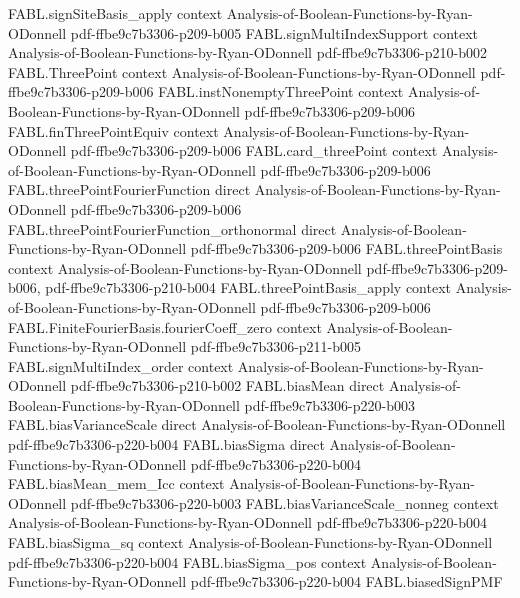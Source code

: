\begin{theorem}
\proofstep
  {FABL.signSiteBasis_apply}
  {context}
  {Analysis-of-Boolean-Functions-by-Ryan-ODonnell}
  {pdf-ffbe9c7b3306-p209-b005}
\proofstep
  {FABL.signMultiIndexSupport}
  {context}
  {Analysis-of-Boolean-Functions-by-Ryan-ODonnell}
  {pdf-ffbe9c7b3306-p210-b002}
\proofstep
  {FABL.ThreePoint}
  {context}
  {Analysis-of-Boolean-Functions-by-Ryan-ODonnell}
  {pdf-ffbe9c7b3306-p209-b006}
\proofstep
  {FABL.instNonemptyThreePoint}
  {context}
  {Analysis-of-Boolean-Functions-by-Ryan-ODonnell}
  {pdf-ffbe9c7b3306-p209-b006}
\proofstep
  {FABL.finThreePointEquiv}
  {context}
  {Analysis-of-Boolean-Functions-by-Ryan-ODonnell}
  {pdf-ffbe9c7b3306-p209-b006}
\proofstep
  {FABL.card_threePoint}
  {context}
  {Analysis-of-Boolean-Functions-by-Ryan-ODonnell}
  {pdf-ffbe9c7b3306-p209-b006}
\proofstep
  {FABL.threePointFourierFunction}
  {direct}
  {Analysis-of-Boolean-Functions-by-Ryan-ODonnell}
  {pdf-ffbe9c7b3306-p209-b006}
\proofstep
  {FABL.threePointFourierFunction_orthonormal}
  {direct}
  {Analysis-of-Boolean-Functions-by-Ryan-ODonnell}
  {pdf-ffbe9c7b3306-p209-b006}
\proofstep
  {FABL.threePointBasis}
  {context}
  {Analysis-of-Boolean-Functions-by-Ryan-ODonnell}
  {pdf-ffbe9c7b3306-p209-b006,
    pdf-ffbe9c7b3306-p210-b004}
\proofstep
  {FABL.threePointBasis_apply}
  {context}
  {Analysis-of-Boolean-Functions-by-Ryan-ODonnell}
  {pdf-ffbe9c7b3306-p209-b006}
\proofstep
  {FABL.FiniteFourierBasis.fourierCoeff_zero}
  {context}
  {Analysis-of-Boolean-Functions-by-Ryan-ODonnell}
  {pdf-ffbe9c7b3306-p211-b005}
\proofstep
  {FABL.signMultiIndex_order}
  {context}
  {Analysis-of-Boolean-Functions-by-Ryan-ODonnell}
  {pdf-ffbe9c7b3306-p210-b002}
\proofstep
  {FABL.biasMean}
  {direct}
  {Analysis-of-Boolean-Functions-by-Ryan-ODonnell}
  {pdf-ffbe9c7b3306-p220-b003}
\proofstep
  {FABL.biasVarianceScale}
  {direct}
  {Analysis-of-Boolean-Functions-by-Ryan-ODonnell}
  {pdf-ffbe9c7b3306-p220-b004}
\proofstep
  {FABL.biasSigma}
  {direct}
  {Analysis-of-Boolean-Functions-by-Ryan-ODonnell}
  {pdf-ffbe9c7b3306-p220-b004}
\proofstep
  {FABL.biasMean_mem_Icc}
  {context}
  {Analysis-of-Boolean-Functions-by-Ryan-ODonnell}
  {pdf-ffbe9c7b3306-p220-b003}
\proofstep
  {FABL.biasVarianceScale_nonneg}
  {context}
  {Analysis-of-Boolean-Functions-by-Ryan-ODonnell}
  {pdf-ffbe9c7b3306-p220-b004}
\proofstep
  {FABL.biasSigma_sq}
  {context}
  {Analysis-of-Boolean-Functions-by-Ryan-ODonnell}
  {pdf-ffbe9c7b3306-p220-b004}
\proofstep
  {FABL.biasSigma_pos}
  {context}
  {Analysis-of-Boolean-Functions-by-Ryan-ODonnell}
  {pdf-ffbe9c7b3306-p220-b004}
\proofstep
  {FABL.biasedSignPMF}

\end{theorem}
